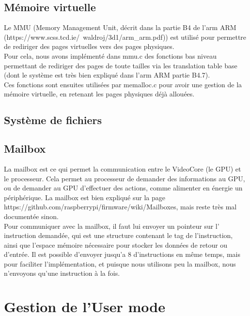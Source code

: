 \documentclass[a4paper]{article}
\begin{document}
\subsection{Mémoire virtuelle}

Le MMU (Memory Management Unit, décrit dans la partie B4 de l'arm ARM
(https://www.scss.tcd.ie/~waldroj/3d1/arm\_arm.pdf)) est utilisé pour permettre
de rediriger des pages virtuelles vers des pages physiques.\\

Pour cela, nous avons implémenté dans mmu.c des fonctions bas niveau permettant de
rediriger des pages de toute tailles via les translation table base (dont le
système est très bien expliqué dans l'arm ARM partie B4.7).\\

Ces fonctions sont ensuites utilisées par memalloc.c pour avoir une gestion de
la mémoire virtuelle, en retenant les pages physiques déjà allouées.

\subsection{Système de fichiers}
\subsection{Mailbox}

La mailbox est ce qui permet la communication entre le VideoCore (le GPU) et le
processeur. Cela permet au processeur de demander des informations au GPU, ou
de demander au GPU d'effectuer des actions, comme alimenter en énergie un
périphérique. La mailbox est bien expliqué sur la page
https://github.com/raspberrypi/firmware/wiki/Mailboxes, mais reste très mal
documentée sinon.\\

Pour communiquer avec la mailbox, il faut lui envoyer un pointeur sur l'
instruction demandée, qui est une structure contenant le tag de
l'instruction, ainsi que l'espace mémoire nécessaire pour stocker les données de
retour ou d'entrée. Il est possible d'envoyer jusqu'a 8 d'instructions en même
temps, mais pour faciliter l'implémentation, et puisque nous utilisons peu la 
mailbox, nous n'envoyons qu'une instruction à la fois.

\section{Gestion de l'User mode}
\end{document}
